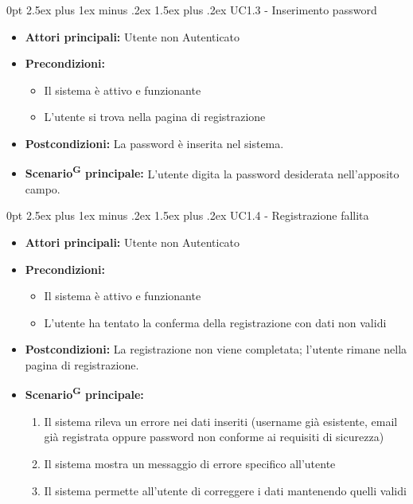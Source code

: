 \documentclass[a4paper, 11pt]{article}
\makeatletter
\renewcommand\paragraph{\@startsection{paragraph}{4}
  {0pt}
  {2.5ex plus 1ex minus .2ex}
  {1.5ex plus .2ex}
  {\normalfont\normalsize\bfseries\color{AccentDark}}}
\makeatother
\begin{document}
\paragraph{UC1.3 - Inserimento password}\label{UC1.3}
\begin{itemize}
	\item \textbf{Attori principali:} Utente non Autenticato
	\item \textbf{Precondizioni:} 
	\begin{itemize}
		\item Il sistema è attivo e funzionante
		\item L'utente si trova nella pagina di registrazione
	\end{itemize}
	\item \textbf{Postcondizioni:} La password è inserita nel sistema.
	\item \textbf{Scenario\textsuperscript{G} principale:} L'utente digita la password desiderata nell'apposito campo.
\end{itemize}

\paragraph{UC1.4 - Registrazione fallita}\label{UC1.4}
\begin{itemize}
	\item \textbf{Attori principali:} Utente non Autenticato
	\item \textbf{Precondizioni:} 
	\begin{itemize}
		\item Il sistema è attivo e funzionante
		\item L'utente ha tentato la conferma della registrazione con dati non validi
	\end{itemize}
	\item \textbf{Postcondizioni:} La registrazione non viene completata; l'utente rimane nella pagina di registrazione.
	\item \textbf{Scenario\textsuperscript{G} principale:}
	\begin{enumerate}
		\item Il sistema rileva un errore nei dati inseriti (username già esistente, email già registrata oppure password non conforme ai requisiti di sicurezza)
		\item Il sistema mostra un messaggio di errore specifico all'utente
		\item Il sistema permette all'utente di correggere i dati mantenendo quelli validi
	\end{enumerate}
\end{itemize}
\end{document}
